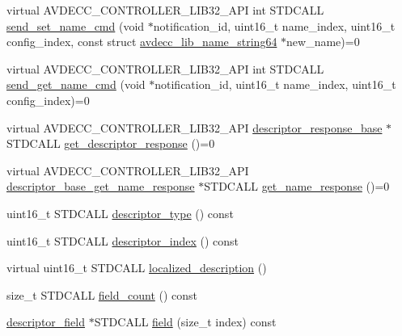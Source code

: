 \begin{DoxyCompactItemize}
virtual A\+V\+D\+E\+C\+C\+\_\+\+C\+O\+N\+T\+R\+O\+L\+L\+E\+R\+\_\+\+L\+I\+B32\+\_\+\+A\+PI int S\+T\+D\+C\+A\+LL \hyperlink{classavdecc__lib_1_1descriptor__base_a6a8c227d7a202f251c689107df7ede0b}{send\+\_\+set\+\_\+name\+\_\+cmd} (void $\ast$notification\+\_\+id, uint16\+\_\+t name\+\_\+index, uint16\+\_\+t config\+\_\+index, const struct \hyperlink{structavdecc__lib_1_1avdecc__lib__name__string64}{avdecc\+\_\+lib\+\_\+name\+\_\+string64} $\ast$new\+\_\+name)=0
\item 
virtual A\+V\+D\+E\+C\+C\+\_\+\+C\+O\+N\+T\+R\+O\+L\+L\+E\+R\+\_\+\+L\+I\+B32\+\_\+\+A\+PI int S\+T\+D\+C\+A\+LL \hyperlink{classavdecc__lib_1_1descriptor__base_a27ba9959456de53a8de18eead74806f7}{send\+\_\+get\+\_\+name\+\_\+cmd} (void $\ast$notification\+\_\+id, uint16\+\_\+t name\+\_\+index, uint16\+\_\+t config\+\_\+index)=0
\item 
virtual A\+V\+D\+E\+C\+C\+\_\+\+C\+O\+N\+T\+R\+O\+L\+L\+E\+R\+\_\+\+L\+I\+B32\+\_\+\+A\+PI \hyperlink{classavdecc__lib_1_1descriptor__response__base}{descriptor\+\_\+response\+\_\+base} $\ast$S\+T\+D\+C\+A\+LL \hyperlink{classavdecc__lib_1_1descriptor__base_ac64e6a5ee8781eeb9c781953e845b1be}{get\+\_\+descriptor\+\_\+response} ()=0
\item 
virtual A\+V\+D\+E\+C\+C\+\_\+\+C\+O\+N\+T\+R\+O\+L\+L\+E\+R\+\_\+\+L\+I\+B32\+\_\+\+A\+PI \hyperlink{classavdecc__lib_1_1descriptor__base__get__name__response}{descriptor\+\_\+base\+\_\+get\+\_\+name\+\_\+response} $\ast$S\+T\+D\+C\+A\+LL \hyperlink{classavdecc__lib_1_1descriptor__base_aba4bf8a81f90f5bf00d5c8b5a7330145}{get\+\_\+name\+\_\+response} ()=0
\item 
uint16\+\_\+t S\+T\+D\+C\+A\+LL \hyperlink{classavdecc__lib_1_1descriptor__base__imp_aefc543029ab093823c3f5b9d84f0ccc4}{descriptor\+\_\+type} () const 
\item 
uint16\+\_\+t S\+T\+D\+C\+A\+LL \hyperlink{classavdecc__lib_1_1descriptor__base__imp_ac23c0a35276c07cfce8c8660700c2135}{descriptor\+\_\+index} () const 
\item 
virtual uint16\+\_\+t S\+T\+D\+C\+A\+LL \hyperlink{classavdecc__lib_1_1descriptor__base__imp_aa94307532fbb37e2f986fee8fec79373}{localized\+\_\+description} ()
\item 
size\+\_\+t S\+T\+D\+C\+A\+LL \hyperlink{classavdecc__lib_1_1descriptor__base__imp_a9b98d4f427a6c527e9080c938cfa9334}{field\+\_\+count} () const 
\item 
\hyperlink{classavdecc__lib_1_1descriptor__field}{descriptor\+\_\+field} $\ast$S\+T\+D\+C\+A\+LL \hyperlink{classavdecc__lib_1_1descriptor__base__imp_a5f8127d32e2aa54777ca03bf09e8d7b5}{field} (size\+\_\+t index) const 

\end{DoxyCompactItemize}
